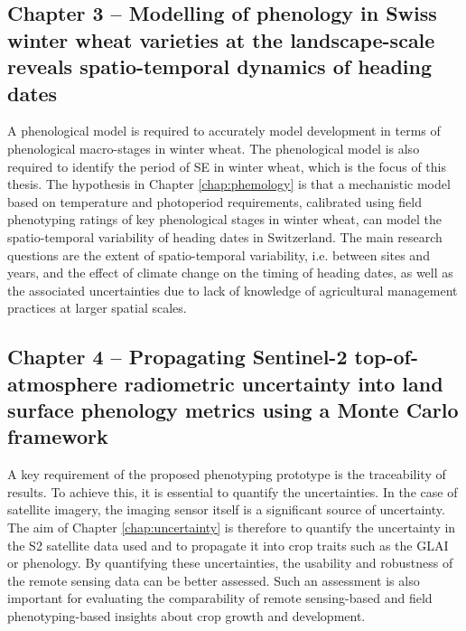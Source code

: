\subsection*{Chapter 3 -- Modelling of phenology in Swiss winter wheat varieties at the landscape-scale reveals spatio-temporal dynamics of heading dates}
A phenological model is required to accurately model development in terms of phenological macro-stages in winter wheat. The phenological model is also required to identify the period of \gls{SE} in winter wheat, which is the focus of this thesis. The hypothesis in Chapter \ref{chap:phemology} is that a mechanistic model based on temperature and photoperiod requirements, calibrated using field phenotyping ratings of key phenological stages in winter wheat, can model the spatio-temporal variability of heading dates in Switzerland. The main research questions are the extent of spatio-temporal variability, i.e. between sites and years, and the effect of climate change on the timing of heading dates, as well as the associated uncertainties due to lack of knowledge of agricultural management practices at larger spatial scales.

\subsection*{Chapter 4 -- Propagating Sentinel-2 top-of-atmosphere radiometric uncertainty into land surface phenology metrics using a Monte Carlo framework}
A key requirement of the proposed phenotyping prototype is the traceability of results. To achieve this, it is essential to quantify the uncertainties. In the case of satellite imagery, the imaging sensor itself is a significant source of uncertainty. The aim of Chapter \ref{chap:uncertainty} is therefore to quantify the uncertainty in the \gls{S2} satellite data used and to propagate it into crop traits such as the \gls{GLAI} or phenology. By quantifying these uncertainties, the usability and robustness of the remote sensing data can be better assessed. Such an assessment is also important for evaluating the comparability of remote sensing-based and field phenotyping-based insights about crop growth and development.

